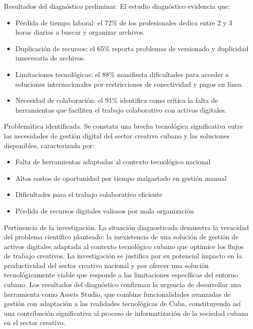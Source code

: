 Resultados del diagnóstico preliminar.
El estudio diagnóstico evidencia que:

\begin{itemize}
    \item Pérdida de tiempo laboral: el 72\% de los profesionales dedica entre 2 y 3 horas diarias a buscar y organizar archivos.
    \item Duplicación de recursos: el 65\% reporta problemas de versionado y duplicidad innecesaria de archivos.
    \item Limitaciones tecnológicas: el 88\% manifiesta dificultades para acceder a soluciones internacionales por restricciones de conectividad y pagos en línea.
    \item Necesidad de colaboración: el 91\% identifica como crítica la falta de herramientas que faciliten el trabajo colaborativo con activos digitales.
   
\end{itemize}

Problemática identificada.
Se constata una brecha tecnológica significativa entre las necesidades de gestión digital del sector creativo cubano y las soluciones disponibles, caracterizada por:
\begin{itemize}
	\item Falta de herramientas adaptadas al contexto tecnológico nacional
	\item Altos costos de oportunidad por tiempo malgastado en gestión manual
	\item Dificultades para el trabajo colaborativo eficiente
	\item Pérdida de recursos digitales valiosos por mala organización
\end{itemize}

Pertinencia de la investigación.
La situación diagnosticada demuestra la veracidad del problema científico planteado: la inexistencia de una solución de gestión de activos digitales adaptada al contexto tecnológico cubano que optimice los flujos de trabajo creativos. La investigación se justifica por su potencial impacto en la productividad del sector creativo nacional y por ofrecer una solución tecnológicamente viable que responde a las limitaciones específicas del entorno cubano.
Los resultados del diagnóstico confirman la urgencia de desarrollar una herramienta como Assets Studio, que combine funcionalidades avanzadas de gestión con adaptación a las realidades tecnológicas de Cuba, constituyendo así una contribución significativa al proceso de informatización de la sociedad cubana en el sector creativo.


